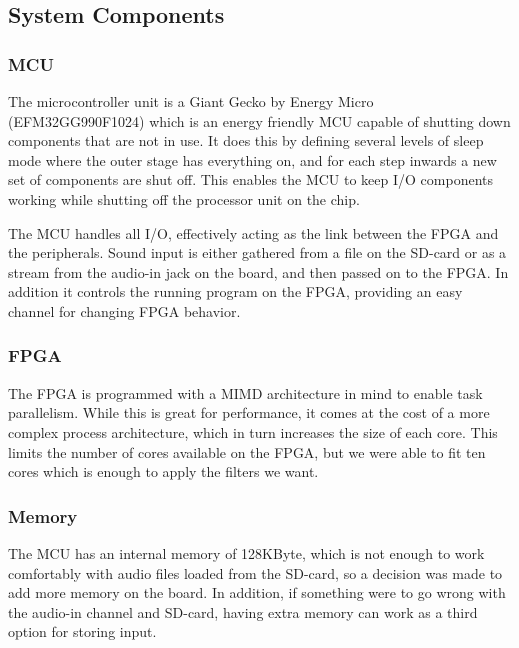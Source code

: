 
\subsection{System Components}

\subsubsection{MCU} The microcontroller unit is a Giant Gecko by Energy Micro
(EFM32GG990F1024) which is an energy friendly MCU capable of shutting down
components that are not in use. It does this by defining several levels of sleep
mode where the outer stage has everything on, and for each step inwards a new
set of components are shut off. This enables the MCU to keep I/O components working while shutting off
the processor unit on the chip.

The MCU handles all I/O, effectively acting as the link between the FPGA and the
peripherals. Sound input is either gathered from a file on the SD-card or as a
stream from the audio-in jack on the board, and then passed on to the FPGA. In
addition it controls the running program on the FPGA, providing an easy channel
for changing FPGA behavior.

\subsubsection{FPGA} The FPGA is programmed with a MIMD architecture in mind to
enable task parallelism. While this is great for performance, it comes at the
cost of a more complex process architecture, which in turn increases the size of
each core. This limits the number of cores available on the FPGA, but we were
able to fit ten cores which is enough to apply
the filters we want.

\subsubsection{Memory} The MCU has an internal memory of 128KByte, which is not
enough to work comfortably with audio files loaded from the SD-card, so a
decision was made to add more memory on the board. In addition, if something
were to go wrong with the audio-in channel and SD-card, having extra memory can
work as a third option for storing input.


